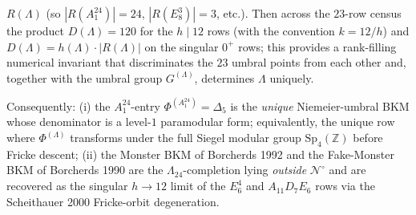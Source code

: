 \begin{theorem}
\begin{enumerate}
 $R(\Lambda)$ (so $|R(A_1^{24})|=24$, $|R(E_8^{3})|=3$, etc.).
 Then across the $23$-row census the product
 $D(\Lambda)=120$ for the $h\mid 12$ rows (with the
 convention $k=12/h$) and
 $D(\Lambda)=h(\Lambda)\cdot|R(\Lambda)|$ on the singular
 $0^+$ rows; this provides a rank-filling numerical invariant
 that discriminates the $23$ umbral points from each other
 and, together with the umbral group $G^{(\Lambda)}$,
 determines $\Lambda$ uniquely.
\end{enumerate}
Consequently: (i) the $A_1^{24}$-entry $\Phi^{(A_1^{24})}=\Delta_5$
is the \emph{unique} Niemeier-umbral BKM whose denominator is a
level-$1$ paramodular form; equivalently, the unique row where
$\Phi^{(\Lambda)}$ transforms under the full Siegel modular group
	$\mathrm{Sp}_4(\mathbb Z)$ before Fricke descent; (ii) the Monster
	BKM of Borcherds 1992 and the Fake-Monster BKM of Borcherds 1990 are the
$\Lambda_{24}$-completion lying \emph{outside} $\mathscr N^\circ$
and are recovered as the singular $h\to 12$ limit of the $E_6^4$ and
$A_{11}D_7E_6$ rows via the Scheithauer 2000 Fricke-orbit
degeneration.
\end{theorem}

